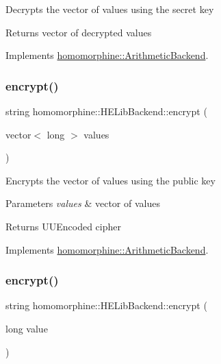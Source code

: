 Decrypts the vector of values using the secret key

\begin{DoxyReturn}{Returns}
vector of decrypted values 
\end{DoxyReturn}


Implements \mbox{\hyperlink{classhomomorphine_1_1_arithmetic_backend_a2fb1ce64e74c4930b7d364ce3b9cc8fe}{homomorphine\+::\+Arithmetic\+Backend}}.

\mbox{\label{classhomomorphine_1_1_h_e_lib_backend_af030a10bdd905f7cccf72c8eabfefdd7}} 
\subsubsection{\texorpdfstring{encrypt()}{encrypt()}\hspace{0.1cm}{\footnotesize\ttfamily [1/2]}}
{\footnotesize\ttfamily string homomorphine\+::\+H\+E\+Lib\+Backend\+::encrypt (\begin{DoxyParamCaption}\item[{vector$<$ long $>$}]{values }\end{DoxyParamCaption})\hspace{0.3cm}{\ttfamily [virtual]}}

Encrypts the vector of values using the public key


\begin{DoxyParams}{Parameters}
{\em values} & vector of values \\
\hline
\end{DoxyParams}
\begin{DoxyReturn}{Returns}
U\+U\+Encoded cipher 
\end{DoxyReturn}


Implements \mbox{\hyperlink{classhomomorphine_1_1_arithmetic_backend_ae97a4987b6024961d8b70a4a0ad2d653}{homomorphine\+::\+Arithmetic\+Backend}}.

\mbox{\label{classhomomorphine_1_1_h_e_lib_backend_a6a958824a123eab41b2099dbc001dc13}} 
\subsubsection{\texorpdfstring{encrypt()}{encrypt()}\hspace{0.1cm}{\footnotesize\ttfamily [2/2]}}
{\footnotesize\ttfamily string homomorphine\+::\+H\+E\+Lib\+Backend\+::encrypt (\begin{DoxyParamCaption}\item[{long}]{value }\end{DoxyParamCaption})\hspace{0.3cm}{\ttfamily [virtual]}}

